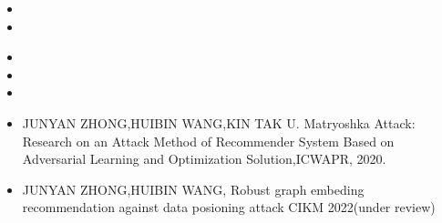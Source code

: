   \begin{itemize}[leftmargin=*]
    \item {}
    \item {}
    
  \end{itemize}
  \begin{itemize}[leftmargin=*]
    \item{}
    \item {}
    \item {}
     \item {JUNYAN ZHONG,HUIBIN WANG,KIN TAK U. Matryoshka Attack: Research on an Attack Method of Recommender System Based on Adversarial Learning and Optimization Solution,ICWAPR, 2020. } 
 \item{JUNYAN ZHONG,HUIBIN WANG, Robust graph embeding recommendation against data posioning attack CIKM 2022(under review)}
  \end{itemize}
